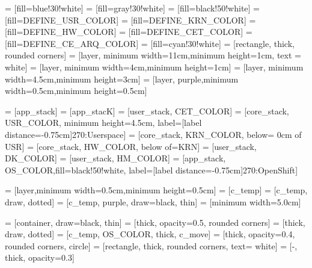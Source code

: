   = [fill=blue!30!white]
 = [fill=gray!30!white]
  = [fill=black!50!white]
 = [fill=DEFINE_USR_COLOR]
 = [fill=DEFINE_KRN_COLOR]
  = [fill=DEFINE_HW_COLOR]
 = [fill=DEFINE_CET_COLOR]
 = [fill=DEFINE_CE_ARQ_COLOR]
  = [fill=cyan!30!white]
      = [rectangle, thick, rounded corners]
 = [layer, minimum width=11cm,minimum height=1cm, text = white]
 = [layer, minimum width=4cm,minimum height=1cm]
  = [layer, minimum width=4.5cm,minimum height=3cm]
  = [layer, purple,minimum width=0.5cm,minimum height=0.5cm]

  = [app_stack]
 = [app_stacK]
 = [user_stack, CET_COLOR]
 = [core_stack, USR_COLOR, minimum height=4.5cm, label={[label distance=-0.75cm]270:\color{white}Userspace}]
 = [core_stack, KRN_COLOR, below= 0cm of USR]
  = [core_stack, HW_COLOR, below of=KRN]
  = [user_stack, DK_COLOR]
  = [user_stack, HM_COLOR]
 = [app_stack, OS_COLOR,fill=black!50!white, label={[label distance=-0.75cm]270:OpenShift}]

 = [layer,minimum width=0.5cm,minimum height=0.5cm]
 = [c_temp]
 = [c_temp, draw, dotted]
 = [c_temp, purple, draw=black, thin]
     = [minimum width=5.0cm]

    = [container, draw=black, thin]
  = [thick, opacity=0.5, rounded corners]
   = [thick, draw, dotted] %
= [c_temp, OS_COLOR, thick, c_move]
  = [thick, opacity=0.4, rounded corners, circle]
 = [rectangle, thick, rounded corners, text= white]
 = [-, thick, opacity=0.3]



